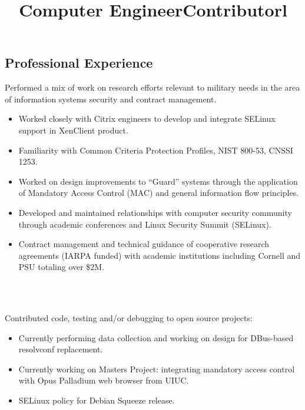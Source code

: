 \begin {resume}
    \section {Professional Experience}
    \title {Computer Engineer}
    \begin {position}
      Performed a mix of work on research efforts relevant to military needs in the area of information systems security and contract management.
      \begin {itemize}
        \setlength {\itemsep}{1pt}
        \setlength {\parskip}{0pt}
        \setlength {\parsep}{0pt}
      \item Worked closely with Citrix engineers to develop and integrate SELinux support in XenClient product.
      \item Familiarity with Common Criteria Protection Profiles, NIST 800-53, CNSSI 1253.
      \item Worked on design improvements to ``Guard'' systems through the application of Mandatory Access Control (MAC) and general information flow principles.
      \item Developed and maintained relationships with computer security community through academic conferences and Linux Security Summit (SELinux).
      \item Contract management and technical guidance of cooperative research agreements (IARPA funded) with academic institutions including Cornell and PSU totaling over \$2M.
      \end {itemize}
    \end {position}
    \title {Contributor}
    \begin {format}
      \title{l}\\
      \body\\
    \end {format}
    \begin {position}
      Contributed code, testing and/or debugging to open source projects:
      \begin {itemize}
        \setlength {\itemsep}{1pt}
        \setlength {\parskip}{0pt}
        \setlength {\parsep}{0pt}
      \item Currently performing data collection and working on design for DBus-based resolvconf replacement.
      \item Currently working on Masters Project: integrating mandatory access control with Opus Palladium web browser from UIUC.
      \item SELinux policy for Debian Squeeze release.
      \end {itemize}
    \end {position}

\end{resume}
